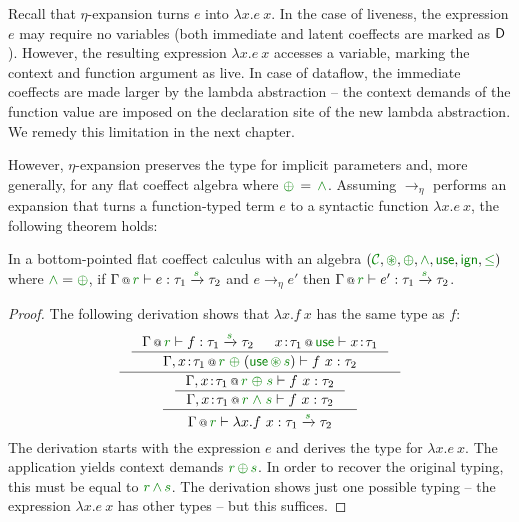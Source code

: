 Recall that $\eta$-expansion turns $e$ into $\lambda x.e~x$. In the case of liveness, the
expression $e$ may require no variables (both immediate and latent coeffects are marked as
$\textnormal{\sffamily D}$). However, the resulting expression $\lambda x.e~x$ accesses a variable,
marking the context and function argument as live. In case of dataflow, the immediate coeffects
are made larger by the lambda abstraction -- the context demands of the function value are
imposed on the declaration site of the new lambda abstraction. We remedy this limitation in
the next chapter.

However, $\eta$-expansion preserves the type for implicit parameters and, more generally,
for any flat coeffect algebra where $\cpar \,=\, \czip$. Assuming $\rightarrow_\eta$
performs an expansion that turns a function-typed term $e$ to a
syntactic function $\lambda x.e~x$, the following theorem holds:

\begin{theorem}
In a bottom-pointed flat coeffect calculus with an algebra $(\C, \cseq, \cpar, \czip, \cunit, \czero, \cleq)$
where $\czip = \cpar$, if $\coctx{\Gamma}{\cclrd{r}} \vdash e : \tau_1 \xrightarrow{\cclrd{s}} \tau_2$
and $e \rightarrow_\eta e'$ then $\coctx{\Gamma}{\cclrd{r}} \vdash e' : \tau_1 \xrightarrow{\cclrd{s}} \tau_2 $.
\end{theorem}
\begin{proof}
The following derivation shows that $\lambda x.f~x$ has the same type as $f$:
\begin{equation*}
\inference
  { \inference
    { \coctx{\Gamma}{\cclrd{r}} \vdash f : \tau_1 \xrightarrow{\cclrd{s}} \tau_2 &
      \coctx{x\!:\!\tau_1}{\cunit} \vdash x\!:\!\tau_1 }
    { \coctx{\Gamma, x\!:\!\tau_1}{\cclrd{r} \;\cpar\; (\cunit \,\cseq\, \cclrd{s}) } \vdash f~x : \tau_2 } }
  { \inference
    { \inference
      { \coctx{\Gamma, x\!:\!\tau_1}{\cclrd{r} \;\cpar\; \cclrd{s} } \vdash f~x : \tau_2 }
      { \coctx{\Gamma, x\!:\!\tau_1}{\cclrd{r} \;\czip\; \cclrd{s} } \vdash f~x : \tau_2 } }
    { \coctx{\Gamma}{ \cclrd{r} } \vdash \lambda x.f~x : \tau_1 \xrightarrow{\cclrd{s}} \tau_2 } }
\end{equation*}
%
The derivation starts with the expression $e$ and derives the type for $\lambda x.e~x$. The
application yields context demands $\cclrd{r}\,\cpar\,\cclrd{s}$. In order to recover the
original typing, this must be equal to $\cclrd{r}\,\czip\,\cclrd{s}$. The derivation
shows just one possible typing -- the expression $\lambda x.e~x$ has other types -- but
this suffices.
\end{proof}

